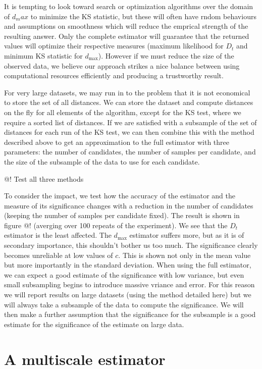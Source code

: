 \documentclass[11pt]{article}
\begin{document}
It is tempting to look toward search or optimization algorithms over the domain of $d_max$ to minimize the KS statistic, but these will often have rndom behaviours and assumptions on smoothness which will reduce the emprical strength of the resulting answer. Only the complete estimator will guarantee that the returned values will optimize their respective measures (maximum likelihood for $D_t$ and minimum KS statistic for $d_{\max}$). However if we must reduce the size of the observed data, we believe our approach strikes a nice balance between using computational resources efficiently and producing a trustworthy result.

For very large datasets, we may run in to the problem that it is not economical to store the set of all distances. We can store the dataset and compute distances on the fly for all elements of the algorithm, except for the KS test, where we require a sorted list of distances. If we are satisfied with a subsample of the set of distances for each run of the KS test, we can then combine this with the method described above to get an approximation to the full estimator with three parameters: the number of candidates, the number of samples per candidate, and the size of the subsample of the data to use for each candidate. 


@! Test all three methods

To consider the impact, we test how the accuracy of the estimator and the measure of its significance changes with a reduction in the number of candidates (keeping the number of samples per candidate fixed). The result is shown in figure @! (averging over 100 repeats of the experiment). We see that the $D_t$ estimator is the least affected. The $d_{\max}$ estimator suffers more, but as it is of secondary importance, this shouldn't bother us too much. The significance clearly becomes unreliable at low values of $c$. This is shown not only in the mean value but more importantly in the standard deviation. When using the full estimator, we can expect a good estimate of the significance with low variance, but even small subsampling begins to introduce massive vriance and error. For this reason we will report results on large datasets (using the method detailed here) but we will always take a subsample of the data to compute the significance. We will then make a further assumption that the significance for the subsample is a good estimate for the significance of the estimate on large data.

\section{A multiscale estimator}
\end{document}
